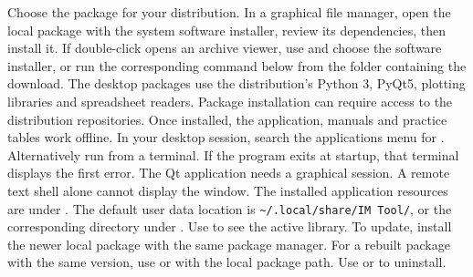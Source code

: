 Choose the package for your distribution. In a graphical file manager, open the local package with the system software installer, review its dependencies, then install it. If double-click opens an archive viewer, use  and choose the software installer, or run the corresponding command below from the folder containing the download.
The desktop packages use the distribution's Python 3, PyQt5, plotting libraries and spreadsheet readers. Package installation can require access to the distribution repositories. Once installed, the application, manuals and practice tables work offline.
In your desktop session, search the applications menu for . Alternatively run  from a terminal. If the program exits at startup, that terminal displays the first error. The Qt application needs a graphical session. A remote text shell alone cannot display the window.
The installed application resources are under . The default user data location is \verb|~/.local/share/IM Tool/|, or the corresponding directory under . Use  to see the active library. To update, install the newer local package with the same package manager. For a rebuilt package with the same version, use  or  with the local package path. Use  or  to uninstall.

